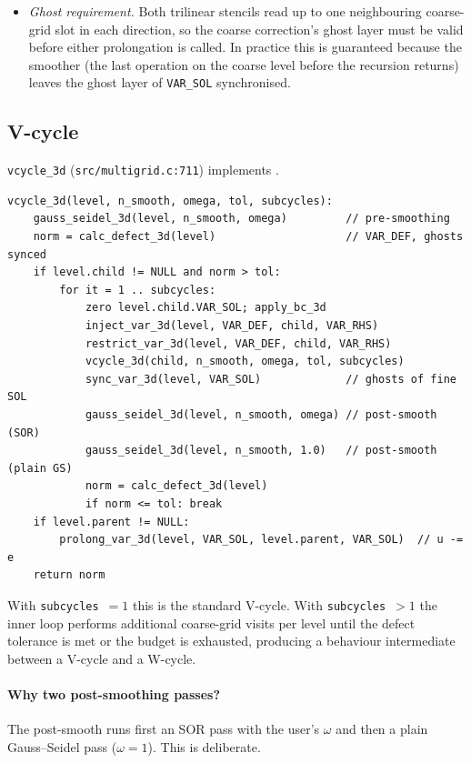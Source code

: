 \documentclass[11pt]{article}
\theoremstyle{definition}
\begin{document}
\begin{itemize}[leftmargin=*]
  \item \emph{Ghost requirement.}  Both trilinear stencils read up to
    one neighbouring coarse-grid slot in each direction, so the
    coarse correction's ghost layer must be valid before either
    prolongation is called.  In practice this is guaranteed because
    the smoother (the last operation on the coarse level before the
    recursion returns) leaves the ghost layer of \texttt{VAR\_SOL}
    synchronised.
\end{itemize}

\subsection{V-cycle}\label{sec:vcycle-impl}
\texttt{vcycle\_3d} (\texttt{src/multigrid.c:711}) implements
.

\begin{lstlisting}[caption={V-cycle pseudocode (matches
\texttt{vcycle\_3d}).},label=alg:vcycle]
vcycle_3d(level, n_smooth, omega, tol, subcycles):
    gauss_seidel_3d(level, n_smooth, omega)         // pre-smoothing
    norm = calc_defect_3d(level)                    // VAR_DEF, ghosts synced
    if level.child != NULL and norm > tol:
        for it = 1 .. subcycles:
            zero level.child.VAR_SOL; apply_bc_3d
            inject_var_3d(level, VAR_DEF, child, VAR_RHS)
            restrict_var_3d(level, VAR_DEF, child, VAR_RHS)
            vcycle_3d(child, n_smooth, omega, tol, subcycles)
            sync_var_3d(level, VAR_SOL)             // ghosts of fine SOL
            gauss_seidel_3d(level, n_smooth, omega) // post-smooth (SOR)
            gauss_seidel_3d(level, n_smooth, 1.0)   // post-smooth (plain GS)
            norm = calc_defect_3d(level)
            if norm <= tol: break
    if level.parent != NULL:
        prolong_var_3d(level, VAR_SOL, level.parent, VAR_SOL)  // u -= e
    return norm
\end{lstlisting}

With \texttt{subcycles}~$=1$ this is the standard V-cycle.  With
\texttt{subcycles}~$>1$ the inner loop performs additional coarse-grid
visits per level until the defect tolerance is met or the budget is
exhausted, producing a behaviour intermediate between a V-cycle and a
W-cycle.

\paragraph{Why two post-smoothing passes?}\label{par:two-postsmooths}
The post-smooth runs first an SOR pass with the user's $\omega$ and
then a plain Gauss--Seidel pass ($\omega = 1$).  This is deliberate.
\end{document}

